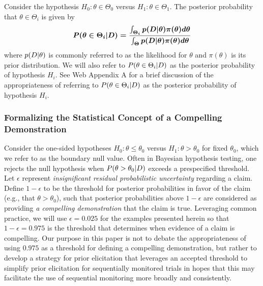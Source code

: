 \documentclass[AMA,STIX1COL,doublespace]{WileyNJD-v2}
\begin{document}
Consider the hypothesis $H_0:\theta\in\Theta_{0}$ versus $H_1:\theta\in\Theta_{1}$. The posterior probability that $\theta\in\Theta_i$ is given by
\begin{equation}
P(\theta\in\Theta_i|\boldmath{D})
=\frac{\int_{\Theta_i} p(\boldmath{D}|\theta)\pi (\theta)d\theta}{\int_{\Theta}p(\boldmath{D}|\theta)\pi(\theta) d\theta}
\end{equation}
where $p(\boldmath{D}|\theta)$ is commonly referred to as the likelihood for $\theta$ and $\pi(\theta)$ is its prior distribution. 
%
%
%
We will also refer to $P(\theta\in\Theta_i|\boldmath{D})$ as the posterior probability of hypothesis $H_i$.
%
See Web Appendix A for a brief discussion of the appropriateness of referring to $P(\theta\in\Theta_i|\boldmath{D})$
as the posterior probability of hypothesis $H_i$.


\subsubsection{Formalizing the Statistical Concept of a Compelling Demonstration}\label{sec:sub_evid}
Consider the one-sided hypotheses $H_0: \theta \le \theta_0$ versus $H_1: \theta > \theta_0$ for fixed $\theta_0$, which we refer to as the boundary null value.
Often in Bayesian hypothesis testing, one rejects the null hypothesis when $P(\theta > \theta_0 |\boldmath{D})$ exceeds 
a prespecified threshold.
%
Let $\epsilon$ represent \textit{insignificant residual probabilistic uncertainty} regarding a claim. 
 Define $1-\epsilon$ to be the threshold for posterior probabilities in favor of the claim 
(e.g., that $\theta > \theta_0$), such that posterior probabilities above $1-\epsilon$ are considered as providing \textit{a compelling demonstration} 
that the claim is true. 
%
Leveraging common practice, we will use $\epsilon=0.025$ for the examples presented herein 
so that $1-\epsilon=0.975$ is the threshold that determines when evidence of a claim is compelling.
%
Our purpose in this paper is not to debate the appropriateness of using $0.975$ as a threshold for defining a compelling demonstration, but rather to develop a strategy for prior elicitation that leverages an accepted threshold to simplify prior elicitation for sequentially monitored trials in hopes that this may facilitate the use of sequential monitoring more broadly and consistently.
\end{document}
